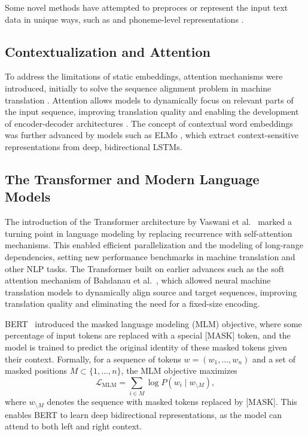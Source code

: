 Some novel methods have attempted to preproces or represent the input text data in unique ways, such as \cite{kim2016character} and phoneme-level representations \cite{goriely2024babble}.

\subsection{Contextualization and Attention}
To address the limitations of static embeddings, attention mechanisms were introduced, initially to solve the sequence alignment problem in machine translation \citep{bahdanau2015neural,luong2015effective}. Attention allows models to dynamically focus on relevant parts of the input sequence, improving translation quality and enabling the development of encoder-decoder architectures \citep{sutskever2014sequence}. The concept of contextual word embeddings was further advanced by models such as ELMo \citep{peters2018deep}, which extract context-sensitive representations from deep, bidirectional LSTMs.

\subsection{The Transformer and Modern Language Models}
The introduction of the Transformer architecture by Vaswani et al.~\citep{vaswani2017attention} marked a turning point in language modeling by replacing recurrence with self-attention mechanisms. This enabled efficient parallelization and the modeling of long-range dependencies, setting new performance benchmarks in machine translation and other NLP tasks. The Transformer built on earlier advances such as the soft attention mechanism of Bahdanau et al.~\citep{bahdanau2015neural}, which allowed neural machine translation models to dynamically align source and target sequences, improving translation quality and eliminating the need for a fixed-size encoding.

BERT~\citep{devlin2019bert} introduced the masked language modeling (MLM) objective, where some percentage of input tokens are replaced with a special [MASK] token, and the model is trained to predict the original identity of these masked tokens given their context. Formally, for a sequence of tokens $w = (w_1, \ldots, w_n)$ and a set of masked positions $M \subset \{1, \ldots, n\}$, the MLM objective maximizes
\begin{equation}
    \mathcal{L}_{\text{MLM}} = \sum_{i \in M} \log P(w_i \mid w_{\setminus M}),
\end{equation}
where $w_{\setminus M}$ denotes the sequence with masked tokens replaced by [MASK]. This enables BERT to learn deep bidirectional representations, as the model can attend to both left and right context. 

